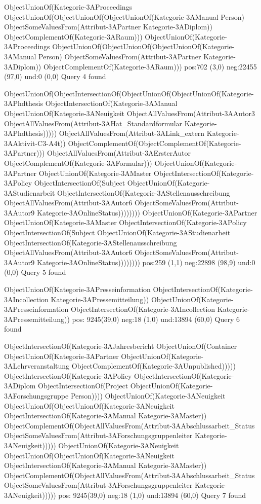 ObjectUnionOf(Kategorie-3AProceedings ObjectUnionOf(ObjectUnionOf(ObjectUnionOf(Kategorie-3AManual Person) ObjectSomeValuesFrom(Attribut-3APartner Kategorie-3ADiplom)) ObjectComplementOf(Kategorie-3ARaum)))
ObjectUnionOf(Kategorie-3AProceedings ObjectUnionOf(ObjectUnionOf(ObjectUnionOf(Kategorie-3AManual Person) ObjectSomeValuesFrom(Attribut-3APartner Kategorie-3ADiplom)) ObjectComplementOf(Kategorie-3ARaum)))
pos:702 (3,0)		 neg:22455 (97,0)		 und:0 (0,0)
Query 4 found

ObjectUnionOf(ObjectIntersectionOf(ObjectUnionOf(ObjectUnionOf(Kategorie-3APhdthesis ObjectIntersectionOf(Kategorie-3AManual ObjectUnionOf(Kategorie-3ANeuigkeit ObjectAllValuesFrom(Attribut-3AAutor3 ObjectAllValuesFrom(Attribut-3AHat_Standardformular Kategorie-3APhdthesis))))) ObjectAllValuesFrom(Attribut-3ALink_extern Kategorie-3AAktivit-C3-A4t)) ObjectComplementOf(ObjectComplementOf(Kategorie-3APartner))) ObjectAllValuesFrom(Attribut-3AErsterAutor ObjectComplementOf(Kategorie-3AFormular)))
ObjectUnionOf(Kategorie-3APartner ObjectUnionOf(Kategorie-3AMaster ObjectIntersectionOf(Kategorie-3APolicy ObjectIntersectionOf(Subject ObjectUnionOf(Kategorie-3AStudienarbeit ObjectIntersectionOf(Kategorie-3AStellenausschreibung ObjectAllValuesFrom(Attribut-3AAutor6 ObjectSomeValuesFrom(Attribut-3AAutor9 Kategorie-3AOnlineStatus))))))))
ObjectUnionOf(Kategorie-3APartner ObjectUnionOf(Kategorie-3AMaster ObjectIntersectionOf(Kategorie-3APolicy ObjectIntersectionOf(Subject ObjectUnionOf(Kategorie-3AStudienarbeit ObjectIntersectionOf(Kategorie-3AStellenausschreibung ObjectAllValuesFrom(Attribut-3AAutor6 ObjectSomeValuesFrom(Attribut-3AAutor9 Kategorie-3AOnlineStatus))))))))
pos:259 (1,1)		 neg:22898 (98,9)		 und:0 (0,0)
Query 5 found

ObjectUnionOf(Kategorie-3APresseinformation ObjectIntersectionOf(Kategorie-3AIncollection Kategorie-3APressemitteilung))
ObjectUnionOf(Kategorie-3APresseinformation ObjectIntersectionOf(Kategorie-3AIncollection Kategorie-3APressemitteilung))
pos: 9245(39,0)		 neg:18 (1,0)		 und:13894 (60,0)
Query 6 found

ObjectIntersectionOf(Kategorie-3AJahresbericht ObjectUnionOf(Container ObjectUnionOf(Kategorie-3APartner ObjectUnionOf(Kategorie-3ALehrveranstaltung ObjectComplementOf(Kategorie-3AUnpublished)))))
ObjectIntersectionOf(Kategorie-3APolicy ObjectIntersectionOf(Kategorie-3ADiplom ObjectIntersectionOf(Project ObjectUnionOf(Kategorie-3AForschungsgruppe Person))))
ObjectUnionOf(Kategorie-3ANeuigkeit ObjectUnionOf(ObjectUnionOf(Kategorie-3ANeuigkeit ObjectIntersectionOf(Kategorie-3AManual Kategorie-3AMaster)) ObjectComplementOf(ObjectAllValuesFrom(Attribut-3AAbschlussarbeit_Status ObjectSomeValuesFrom(Attribut-3AForschungsgruppenleiter Kategorie-3ANeuigkeit)))))
ObjectUnionOf(Kategorie-3ANeuigkeit ObjectUnionOf(ObjectUnionOf(Kategorie-3ANeuigkeit ObjectIntersectionOf(Kategorie-3AManual Kategorie-3AMaster)) ObjectComplementOf(ObjectAllValuesFrom(Attribut-3AAbschlussarbeit_Status ObjectSomeValuesFrom(Attribut-3AForschungsgruppenleiter Kategorie-3ANeuigkeit)))))
pos: 9245(39,0)		 neg:18 (1,0)		 und:13894 (60,0)
Query 7 found

